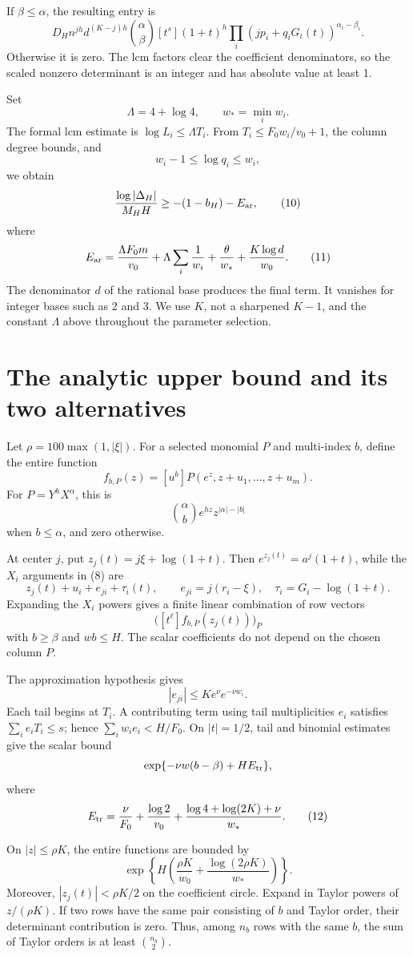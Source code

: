 If \(\beta\le\alpha\), the resulting entry is
\[
D_Hn^{jh}d^{(K-j)h}\binom{\alpha}{\beta}
[t^s](1+t)^h
\prod_i(jp_i+q_iG_i(t))^{\alpha_i-\beta_i}.
\]
Otherwise it is zero. The lcm factors clear the coefficient denominators, so the scaled nonzero determinant is an integer and has absolute value at least 1.

Set
\[
\Lambda=4+\log4,\qquad w_*=\min_iw_i.
\]
The formal lcm estimate is \(\log L_i\le\Lambda T_i\). From \(T_i\le F_0w_i/v_0+1\), the column degree bounds, and
\[
w_i-1\le\log q_i\le w_i,
\]
we obtain
\[
\frac{\log|\Delta_H|}{M_HH}\ge-(1-b_H)-E_{\rm ar},
\tag{10}
\]
where
\[
E_{\rm ar}=
\frac{\Lambda F_0m}{v_0}
+\Lambda\sum_i\frac1{w_i}
+\frac{\theta}{w_*}
+\frac{K\log d}{w_0}.
\tag{11}
\]
The denominator \(d\) of the rational base produces the final term. It vanishes for integer bases such as 2 and 3. We use \(K\), not a sharpened \(K-1\), and the constant \(\Lambda\) above throughout the parameter selection.

\section{The analytic upper bound and its two alternatives}

Let \(\rho=100\max(1,|\xi|)\). For a selected monomial \(P\) and multi-index \(b\), define the entire function
\[
f_{b,P}(z)=[u^b]P(e^z,z+u_1,\ldots,z+u_m).
\]
For \(P=Y^hX^\alpha\), this is
\[
\binom{\alpha}{b}e^{hz}z^{|\alpha|-|b|}
\]
when \(b\le\alpha\), and zero otherwise.

At center \(j\), put \(z_j(t)=j\xi+\log(1+t)\). Then \(e^{z_j(t)}=a^j(1+t)\), while the \(X_i\) arguments in (8) are
\[
z_j(t)+u_i+e_{ji}+\tau_i(t),\qquad
e_{ji}=j(r_i-\xi),\quad
\tau_i=G_i-\log(1+t).
\]
Expanding the \(X_i\) powers gives a finite linear combination of row vectors
\[
\bigl([t^\ell]f_{b,P}(z_j(t))\bigr)_P
\]
with \(b\ge\beta\) and \(wb\le H\). The scalar coefficients do not depend on the chosen column \(P\).

The approximation hypothesis gives
\[
|e_{ji}|\le K e^\nu e^{-\nu w_i}.
\]
Each tail begins at \(T_i\). A contributing term using tail multiplicities \(e_i\) satisfies \(\sum_i e_iT_i\le s\); hence \(\sum_iw_ie_i<H/F_0\). On \(|t|=1/2\), tail and binomial estimates give the scalar bound
\[
\exp\{-\nu w(b-\beta)+H E_{\rm tr}\},
\]
where
\[
E_{\rm tr}=
\frac{\nu}{F_0}+\frac{\log2}{v_0}
+\frac{\log4+\log(2K)+\nu}{w_*}.
\tag{12}
\]

On \(|z|\le\rho K\), the entire functions are bounded by
\[
\exp\left\{H\left(\frac{\rho K}{w_0}
+\frac{\log(2\rho K)}{w_*}\right)\right\}.
\]
Moreover, \(|z_j(t)|<\rho K/2\) on the coefficient circle. Expand in Taylor powers of \(z/(\rho K)\). If two rows have the same pair consisting of \(b\) and Taylor order, their determinant contribution is zero. Thus, among \(n_b\) rows with the same \(b\), the sum of Taylor orders is at least \(\binom{n_b}{2}\).

